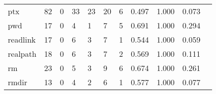 \begin{longtable}{lp{1.20cm}p{1.20cm}p{1.20cm}p{1.20cm}p{1.20cm}p{1.20cm}p{1.20cm}p{1.20cm}p{1.20cm}p{1.20cm}}
ptx       &                                    82 &                                                  0 &                                                 33 &                                                 23 &                                                 20 &                                                  6 &                                         0.497 &                                              1.000 &                                              0.073 \\
pwd       &                                    17 &                                                  0 &                                                  4 &                                                  1 &                                                  7 &                                                  5 &                                         0.691 &                                              1.000 &                                              0.294 \\
readlink  &                                    17 &                                                  0 &                                                  6 &                                                  3 &                                                  7 &                                                  1 &                                         0.544 &                                              1.000 &                                              0.059 \\
realpath  &                                    18 &                                                  0 &                                                  6 &                                                  3 &                                                  7 &                                                  2 &                                         0.569 &                                              1.000 &                                              0.111 \\
rm        &                                    23 &                                                  0 &                                                  5 &                                                  3 &                                                  9 &                                                  6 &                                         0.674 &                                              1.000 &                                              0.261 \\
rmdir     &                                    13 &                                                  0 &                                                  4 &                                                  2 &                                                  6 &                                                  1 &                                         0.577 &                                              1.000 &                                              0.077 \\

\end{longtable}

